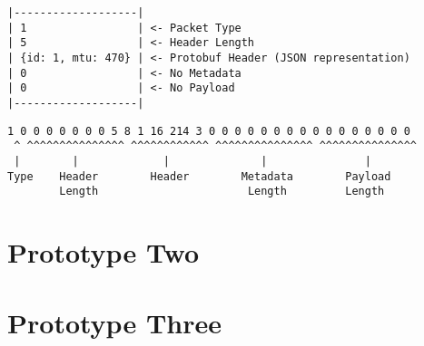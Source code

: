 \begin{lstlisting}[float,caption={Prototype One Example Packet Structure},label=p1d-example-structure]
|-------------------|
| 1                 | <- Packet Type
| 5                 | <- Header Length
| {id: 1, mtu: 470} | <- Protobuf Header (JSON representation)
| 0                 | <- No Metadata
| 0                 | <- No Payload
|-------------------|
\end{lstlisting}

\begin{lstlisting}[float,caption={Prototype One Example Packet Binary},label=p1d-example-binary]
 1 0 0 0 0 0 0 0 5 8 1 16 214 3 0 0 0 0 0 0 0 0 0 0 0 0 0 0 0 0
 ^ ^^^^^^^^^^^^^^^ ^^^^^^^^^^^^ ^^^^^^^^^^^^^^^ ^^^^^^^^^^^^^^^
 |        |             |              |               |
Type    Header        Header        Metadata        Payload
        Length                       Length         Length
\end{lstlisting}

\FloatBarrier

\section{Prototype Two}

\section{Prototype Three}

